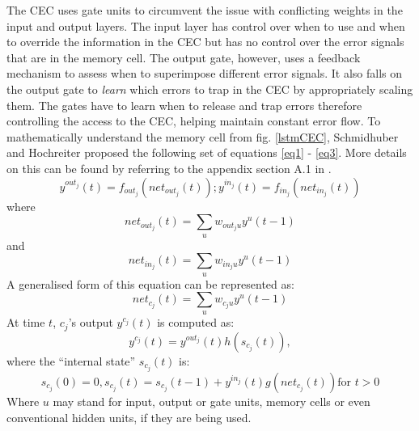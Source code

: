 \documentclass[a4paper,12pt]{report}
\begin{document}
            The CEC uses gate units to circumvent the issue with conflicting weights in the input and output layers. The input layer has control over when to use and when to override the information in the CEC but has no control over the error signals that are in the memory cell. The output gate, however, uses a feedback mechanism to assess when to superimpose different error signals. It also falls on the output gate to \textit{learn} which errors to trap in the CEC by appropriately scaling them. The gates have to learn when to release and trap errors therefore controlling the access to the CEC, helping maintain constant error flow. To mathematically understand the memory cell from fig. \ref{lstmCEC}, Schmidhuber and Hochreiter proposed the following set of equations \ref{eq1} - \ref{eq3}. More details on this can be found by referring to the appendix section A.1 in \citep{lstmoriginal}.
            \begin{equation}\label{eq1}
                y^{{out }_{j}}(t)=f_{ {out }_{j}}\left( { net }_{ {out }_{j}}(t)\right) ; y^{i n_{j}}(t)=f_{i n_{j}}\left( { net }_{i n_{j}}(t)\right)
            \end{equation}
	        where
            \begin{equation}\label{eq2}
                net_{out_{j}}(t)=\sum_{u} w_{out_{j} u} y^{u}(t-1)
            \end{equation}
            and
            \begin{equation}\label{eq3}
                            net_{in_{j}}(t)=\sum_{u} w_{in_{j} u} y^{u}(t-1)
            \end{equation}
            A generalised form of this equation can be represented as:
            \begin{equation}\label{eq4}
                            net_{c_{j}}(t)=\sum_{u} w_{c_{j} u} y^{u}(t-1)
            \end{equation}
            At time $ t $, $ c_{j} $'s output $ y^{c_{j}}(t) $ is computed as:
            \begin{equation}\label{eq5}
                y^{c_{j}}(t) = y^{out_{j}}(t)h(s_{c_{j}}(t)),
            \end{equation}
            where the ``internal state'' $ s_{c_j}(t) $ is:
            \begin{equation}\label{eq6}
                s_{c_{j}}(0)=0, s_{c_{j}}(t)=s_{c_{j}}(t-1)+y^{i n_{j}}(t) g\left( { net }_{c_{j}}(t)\right) \textrm{for } t>0
            \end{equation}
            Where $ u $ may stand for input, output or gate units, memory cells or even conventional hidden units, if they are being used.
\end{document}
